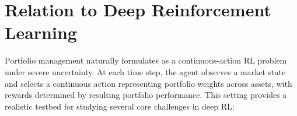 \documentclass[10pt]{article}
\begin{document}



\section{Relation to Deep Reinforcement Learning}

Portfolio management naturally formulates as a continuous-action RL problem under severe uncertainty. At each time step, the agent observes a market state and selects a continuous action representing portfolio weights across assets, with rewards determined by resulting portfolio performance. This setting provides a realistic testbed for studying several core challenges in deep RL:
\end{document}
